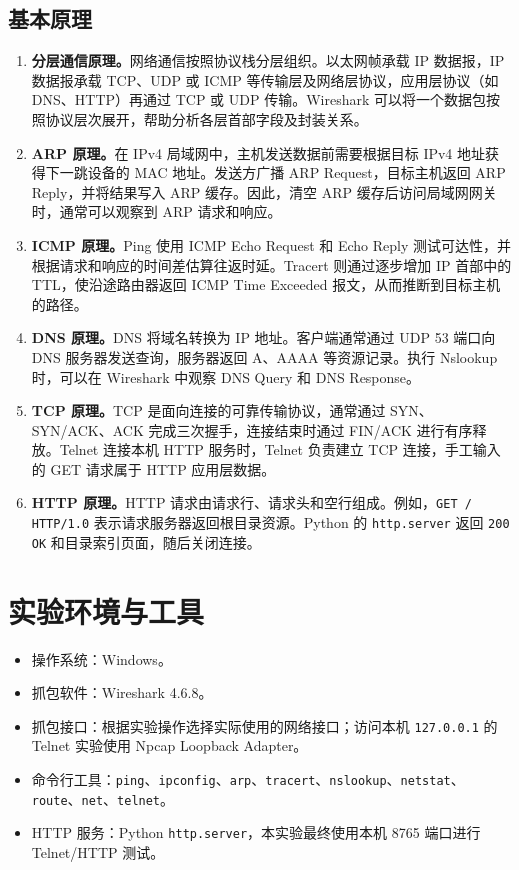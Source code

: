 \documentclass[UTF8,a4paper,zihao=-4]{ctexart}
\begin{document}
\subsection{基本原理}
\begin{enumerate}
  \item \textbf{分层通信原理。}网络通信按照协议栈分层组织。以太网帧承载 IP 数据报，IP 数据报承载 TCP、UDP 或 ICMP 等传输层及网络层协议，应用层协议（如 DNS、HTTP）再通过 TCP 或 UDP 传输。Wireshark 可以将一个数据包按照协议层次展开，帮助分析各层首部字段及封装关系。
  \item \textbf{ARP 原理。}在 IPv4 局域网中，主机发送数据前需要根据目标 IPv4 地址获得下一跳设备的 MAC 地址。发送方广播 ARP Request，目标主机返回 ARP Reply，并将结果写入 ARP 缓存。因此，清空 ARP 缓存后访问局域网网关时，通常可以观察到 ARP 请求和响应。
  \item \textbf{ICMP 原理。}Ping 使用 ICMP Echo Request 和 Echo Reply 测试可达性，并根据请求和响应的时间差估算往返时延。Tracert 则通过逐步增加 IP 首部中的 TTL，使沿途路由器返回 ICMP Time Exceeded 报文，从而推断到目标主机的路径。
  \item \textbf{DNS 原理。}DNS 将域名转换为 IP 地址。客户端通常通过 UDP 53 端口向 DNS 服务器发送查询，服务器返回 A、AAAA 等资源记录。执行 Nslookup 时，可以在 Wireshark 中观察 DNS Query 和 DNS Response。
  \item \textbf{TCP 原理。}TCP 是面向连接的可靠传输协议，通常通过 SYN、SYN/ACK、ACK 完成三次握手，连接结束时通过 FIN/ACK 进行有序释放。Telnet 连接本机 HTTP 服务时，Telnet 负责建立 TCP 连接，手工输入的 GET 请求属于 HTTP 应用层数据。
  \item \textbf{HTTP 原理。}HTTP 请求由请求行、请求头和空行组成。例如，\texttt{GET / HTTP/1.0} 表示请求服务器返回根目录资源。Python 的 \texttt{http.server} 返回 \texttt{200 OK} 和目录索引页面，随后关闭连接。
\end{enumerate}

\section{实验环境与工具}
\begin{itemize}
  \item 操作系统：Windows。
  \item 抓包软件：Wireshark 4.6.8。
  \item 抓包接口：根据实验操作选择实际使用的网络接口；访问本机 \texttt{127.0.0.1} 的 Telnet 实验使用 Npcap Loopback Adapter。
  \item 命令行工具：\texttt{ping}、\texttt{ipconfig}、\texttt{arp}、\texttt{tracert}、\texttt{nslookup}、\texttt{netstat}、\texttt{route}、\texttt{net}、\texttt{telnet}。
  \item HTTP 服务：Python \texttt{http.server}，本实验最终使用本机 8765 端口进行 Telnet/HTTP 测试。
\end{itemize}
\end{document}
